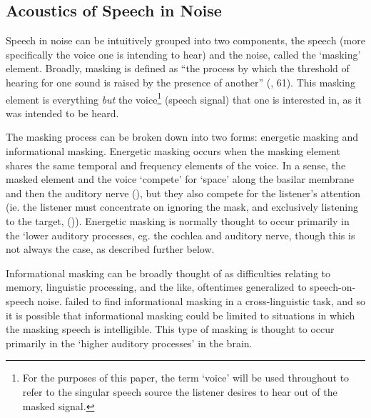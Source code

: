 \subsection{Acoustics of Speech in Noise}
\label{bkgrnd:speech_in_noise}

Speech in noise can be intuitively grouped into two components, the speech (more specifically the voice one is intending to hear) and the noise, called the `masking' element.  Broadly, masking is defined as ``the process by which the threshold of hearing for one sound is raised by the presence of another'' (\cite{ansi:13}, 61).  This masking element is everything \textit{but} the voice\footnote{For the purposes of this paper, the term `voice' will be used throughout to refer to the singular speech source the listener desires to hear out of the masked signal.} (speech signal) that one is interested in, as it was intended to be heard.

The masking process can be broken down into two forms: energetic masking and informational masking.  Energetic masking occurs when the masking element shares the same temporal and frequency elements of the voice.  In a sense, the masked element and the voice `compete' for `space' along the basilar membrane and then the auditory nerve (\cite{brungart:01}), but they also compete for the listener's attention (ie. the listener must concentrate on ignoring the mask, and exclusively listening to the target, (\cite{mattys:12})).  Energetic masking is normally thought to occur primarily in the `lower auditory processes, eg. the cochlea and auditory nerve, though this is not always the case, as described further below.  

Informational masking can be broadly thought of as difficulties relating to memory, linguistic processing, and the like, oftentimes generalized to speech-on-speech noise.  \cite{mattys:10} failed to find informational masking in a cross-linguistic task, and so it is possible that informational masking could be limited to situations in which the masking speech is intelligible. This type of masking is thought to occur primarily in the `higher auditory processes' in the brain.

